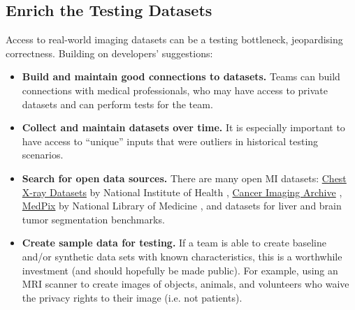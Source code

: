 \documentclass[12pt, 3p, times]{elsarticle} %
\begin{document}
\subsection{Enrich the Testing Datasets} \label{sec_recommendations_testing_dataset}

Access to real-world imaging datasets can be a testing bottleneck,
jeopardising correctness. Building on developers' suggestions:

\begin{itemize}
\item \textbf{Build and maintain good connections to datasets.} 
Teams can build
connections with medical professionals, who may have
access to private datasets and can perform tests for the team.

\item \textbf{Collect and maintain datasets over time.} It is especially
important to have access to ``unique'' inputs that were outliers in
historical testing scenarios.

\item \textbf{Search for open data sources.} There are many open MI
datasets:
\href{https://nihcc.app.box.com/v/ChestXray-NIHCC}{Chest X-ray Datasets} by
National Institute of Health \cite{WangEtAl2017},
\href{https://www.cancerimagingarchive.net/}{Cancer Imaging Archive}
\cite{PriorEtAl2017}, \href{https://medpix.nlm.nih.gov/home}{MedPix} by
National Library of Medicine \cite{Smirniotopoulos2014}, and datasets for liver
\cite{BilicEtAl2019} and brain \cite{MenzeEtAl2015} tumor segmentation
benchmarks.

\item \textbf{Create sample data for testing.} If a team is able to create
baseline and/or synthetic data sets with known characteristics, this is a
worthwhile investment (and should hopefully be made public). For example, using
an MRI scanner to create images of objects, animals, and volunteers who waive
the privacy rights to their image (i.e. not patients).

%

\end{itemize}
\end{document}
